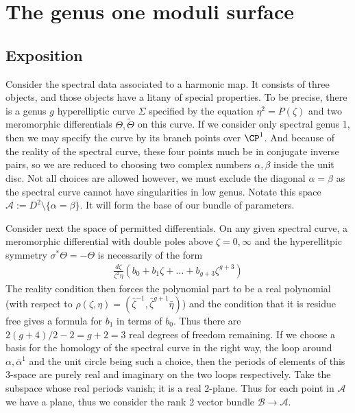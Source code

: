 \section{The genus one moduli surface}
\subsection{Exposition}
Consider the spectral data associated to a harmonic map. It consists of three objects, and those objects have a litany of special properties. To be precise, there is a genus $g$ hyperelliptic curve $Σ$ specified by the equation $η^2=P(ζ)$ and two meromorphic differentials $Θ, \tilde{Θ}$ on this curve. If we consider only spectral genus 1, then we may specify the curve by its branch points over $\CP^1$. And because of the reality of the spectral curve, these four points much be in conjugate inverse pairs, so we are reduced to choosing two complex numbers $α,β$ inside the unit disc. Not all choices are allowed however, we must exclude the diagonal $α=β$ as the spectral curve cannot have singularities in low genus. Notate this space $\mathcal{A} := D^2 \setminus \{α=β\}$. It will form the base of our bundle of parameters.

Consider next the space of permitted differentials. On any given spectral curve, a meromorphic differential with double poles above $ζ=0,\infty$ and the hyperellitpic symmetry $σ^* Θ = - Θ$ is necessarily of the form
\begin{align}
\frac{dζ}{ζ^2η}\left( b_0 + b_1ζ + \ldots + b_{g+3}ζ^{g+3} \right)
\end{align}
The reality condition then forces the polynomial part to be a real polynomial (with respect to $ρ(ζ,η) = (\bar{ζ}^{-1}, \bar{ζ}^{g+1}\bar{η})$) and the condition that it is residue free gives a formula for $b_1$ in terms of $b_0$. Thus there are $2(g+4)/2-2 = g+2=3$ real degrees of freedom remaining. If we choose a basis for the homology of the spectral curve in the right way, the loop around $α,\bar{α}^1$ and the unit circle being such a choice, then the periods of elements of this $3$-space are purely real and imaginary on the two loops respectively. Take the subspace whose real periods vanish; it is a real $2$-plane. Thus for each point in $\mathcal{A}$ we have a plane, thus we consider the rank 2 vector bundle $\mathcal{B}\to\mathcal{A}$.

